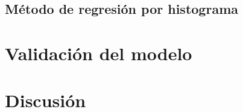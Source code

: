 \subsection{Método de regresión por histograma}

\section{Validación del modelo}
\label{sec:res_validacion}


\section{Discusión}
\label{sec:res_discusion}


